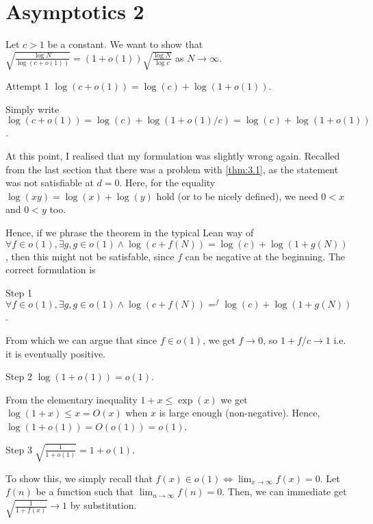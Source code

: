 \documentclass{article}[11px]
\begin{document}
\pagebreak

\section{Asymptotics 2}\label{sec:asymptotics2}

Let \(c > 1\) be a constant. We want to show that \(\sqrt{\frac{\log N}{\log(c + o(1))}} = (1 + o(1))\sqrt{\frac{\log N}{\log c}}\) as \(N \to \infty\).

\begin{theorem}{Attempt 1}{}
  \(\log(c + o(1)) = \log(c) + \log(1 + o(1))\).
\end{theorem}

Simply write \(\log(c + o(1)) = \log(c) + \log(1 + o(1) / c) = \log(c) + \log(1 + o(1))\).

At this point, I realised that my formulation was slightly wrong again. Recalled from the last section that there was a problem with \ref{thm:3.1}, as the statement was not satisfiable at \(d = 0\). Here, for the equality \(\log(xy) = \log(x) + \log(y)\) hold (or to be nicely defined), we need \(0 < x\) and \(0 < y\) too.

Hence, if we phrase the theorem in the typical Lean way of \(\forall f \in o(1), \exists g, g \in o(1) \land \log(c + f(N)) = \log(c) + \log(1 + g(N))\), then this might not be satisfable, since \(f\) can be negative at the beginning. The correct formulation is

\begin{theorem}{Step 1}{}
  \(\forall f \in o(1), \exists g, g \in o(1) \land \log(c + f(N)) =^f \log(c) + \log(1 + g(N))\).
\end{theorem}

From which we can argue that since \(f \in o(1)\), we get \(f \to 0\), so \(1 + f / c \to 1\) i.e. it is eventually positive.

\begin{theorem}{Step 2}{}
  \(\log(1 + o(1)) = o(1)\).
\end{theorem}

From the elementary inequality \(1 + x \leq \exp(x)\) we get \(\log(1 + x) \leq x = O(x)\) when \(x\) is large enough (non-negative). Hence, \(\log(1 + o(1)) = O(o(1)) = o(1)\).

\begin{theorem}{Step 3}{}
  \(\sqrt{\frac{1}{1 + o(1)}} = 1 + o(1)\).
\end{theorem}

To show this, we simply recall that \(f(x) \in o(1) \iff \lim_{x \to \infty} f(x) = 0\). Let \(f(n)\) be a function such that \(\lim_{n \to \infty} f(n) = 0\). Then, we can immediate get \(\sqrt{\frac{1}{1 + f(x)}} \to 1\) by substitution.
\end{document}
